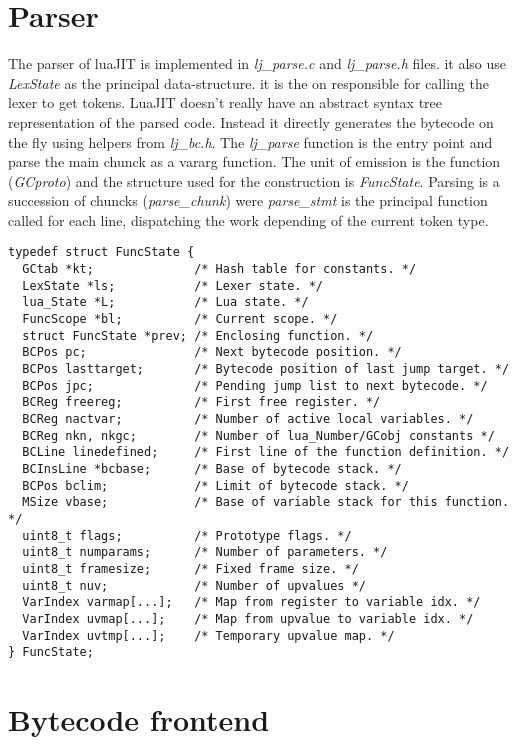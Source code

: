 \section{Parser}
\label{Sec:Parser}

The parser of luaJIT is implemented in \emph{lj\_parse.c} and \emph{lj\_parse.h}
files. it also use \emph{LexState} as the principal data-structure. it is the on
responsible for calling the lexer to get tokens. LuaJIT doesn't really have an
abstract syntax tree representation of the parsed code. Instead it directly
generates the bytecode on the fly using helpers from \emph{lj\_bc.h}.
The \emph{lj\_parse} function is the entry point and parse the main chunck as a
vararg function. The unit of emission is the function (\emph{GCproto}) and the structure used for the construction is \emph{FuncState}. Parsing is a succession
of chuncks (\emph{parse\_chunk}) were \emph{parse\_stmt} is the principal
function called for each line, dispatching the work depending of the current
token type.

\begin{lstlisting}[style=CStyle]
typedef struct FuncState {
  GCtab *kt;              /* Hash table for constants. */
  LexState *ls;           /* Lexer state. */
  lua_State *L;           /* Lua state. */
  FuncScope *bl;          /* Current scope. */
  struct FuncState *prev; /* Enclosing function. */
  BCPos pc;               /* Next bytecode position. */
  BCPos lasttarget;       /* Bytecode position of last jump target. */
  BCPos jpc;              /* Pending jump list to next bytecode. */
  BCReg freereg;          /* First free register. */
  BCReg nactvar;          /* Number of active local variables. */
  BCReg nkn, nkgc;        /* Number of lua_Number/GCobj constants */
  BCLine linedefined;     /* First line of the function definition. */
  BCInsLine *bcbase;      /* Base of bytecode stack. */
  BCPos bclim;            /* Limit of bytecode stack. */
  MSize vbase;            /* Base of variable stack for this function. */
  uint8_t flags;          /* Prototype flags. */
  uint8_t numparams;      /* Number of parameters. */
  uint8_t framesize;      /* Fixed frame size. */
  uint8_t nuv;            /* Number of upvalues */
  VarIndex varmap[...];   /* Map from register to variable idx. */
  VarIndex uvmap[...];    /* Map from upvalue to variable idx. */
  VarIndex uvtmp[...];    /* Temporary upvalue map. */
} FuncState;
\end{lstlisting}
\section{Bytecode frontend}
\label{Sec:bc-frontend}

